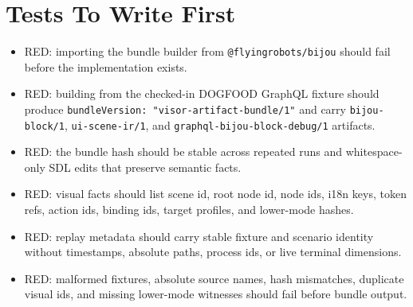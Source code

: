 \section{Tests To Write First}\label{record-145-tests-to-write-first}

\begin{itemize}
\tightlist
\item
  RED: importing the bundle builder from \texttt{@\allowbreak{}f\allowbreak{}l\allowbreak{}y\allowbreak{}i\allowbreak{}n\allowbreak{}g\allowbreak{}r\allowbreak{}o\allowbreak{}b\allowbreak{}o\allowbreak{}t\allowbreak{}s\allowbreak{}/\allowbreak{}b\allowbreak{}i\allowbreak{}j\allowbreak{}o\allowbreak{}u} should fail before the implementation exists.
\item
  RED: building from the checked-in DOGFOOD GraphQL fixture should produce \texttt{b\allowbreak{}u\allowbreak{}n\allowbreak{}d\allowbreak{}l\allowbreak{}e\allowbreak{}V\allowbreak{}e\allowbreak{}r\allowbreak{}s\allowbreak{}i\allowbreak{}o\allowbreak{}n\allowbreak{}:\allowbreak{} \allowbreak{}"\allowbreak{}v\allowbreak{}i\allowbreak{}s\allowbreak{}o\allowbreak{}r\allowbreak{}-\allowbreak{}a\allowbreak{}r\allowbreak{}t\allowbreak{}i\allowbreak{}f\allowbreak{}a\allowbreak{}c\allowbreak{}t\allowbreak{}-\allowbreak{}b\allowbreak{}u\allowbreak{}n\allowbreak{}d\allowbreak{}l\allowbreak{}e\allowbreak{}/\allowbreak{}1\allowbreak{}"} and carry \texttt{b\allowbreak{}i\allowbreak{}j\allowbreak{}o\allowbreak{}u\allowbreak{}-\allowbreak{}b\allowbreak{}l\allowbreak{}o\allowbreak{}c\allowbreak{}k\allowbreak{}/\allowbreak{}1}, \texttt{u\allowbreak{}i\allowbreak{}-\allowbreak{}s\allowbreak{}c\allowbreak{}e\allowbreak{}n\allowbreak{}e\allowbreak{}-\allowbreak{}i\allowbreak{}r\allowbreak{}/\allowbreak{}1}, and \texttt{g\allowbreak{}r\allowbreak{}a\allowbreak{}p\allowbreak{}h\allowbreak{}q\allowbreak{}l\allowbreak{}-\allowbreak{}b\allowbreak{}i\allowbreak{}j\allowbreak{}o\allowbreak{}u\allowbreak{}-\allowbreak{}b\allowbreak{}l\allowbreak{}o\allowbreak{}c\allowbreak{}k\allowbreak{}-\allowbreak{}d\allowbreak{}e\allowbreak{}b\allowbreak{}u\allowbreak{}g\allowbreak{}/\allowbreak{}1} artifacts.
\item
  RED: the bundle hash should be stable across repeated runs and whitespace-only SDL edits that preserve semantic facts.
\item
  RED: visual facts should list scene id, root node id, node ids, i18n keys, token refs, action ids, binding ids, target profiles, and lower-mode hashes.
\item
  RED: replay metadata should carry stable fixture and scenario identity without timestamps, absolute paths, process ids, or live terminal dimensions.
\item
  RED: malformed fixtures, absolute source names, hash mismatches, duplicate visual ids, and missing lower-mode witnesses should fail before bundle output.
\end{itemize}

